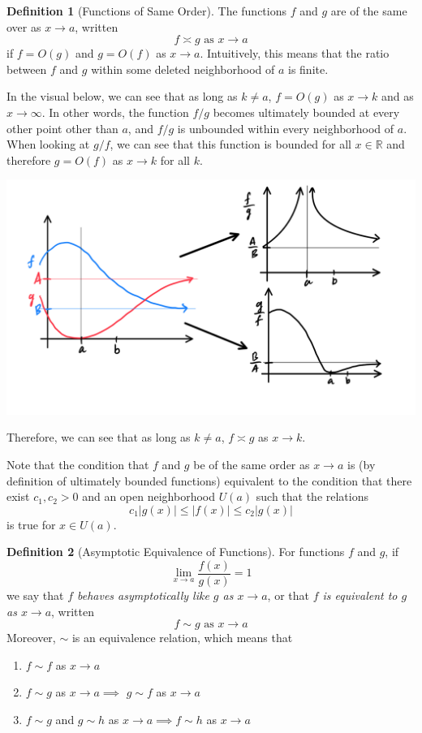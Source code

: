 \documentclass{article}
\theoremstyle{remark}
\theoremstyle{definition}
\newtheorem{definition}{Definition}[section]
\begin{document}
\begin{definition}[Functions of Same Order]
The functions $f$ and $g$ are of the same over as $x \rightarrow a$, written 
\[f \asymp g \text{ as } x \rightarrow a\]
if $f = O(g)$ and $g = O(f)$ as $x \rightarrow a$. Intuitively, this means that the ratio between $f$ and $g$ within some deleted neighborhood of $a$ is finite. 

In the visual below, we can see that as long as $k \neq a$, $f = O(g)$ as $x \rightarrow k$ and as $x \rightarrow \infty$. In other words, the function $f/g$ becomes ultimately bounded at every other point other than $a$, and $f/g$ is unbounded within every neighborhood of $a$. When looking at $g/f$, we can see that this function is bounded for all $x \in \mathbb{R}$ and therefore $g = O(f)$ as $x \rightarrow k$ for all $k$. 
\begin{center}
    \includegraphics[scale=0.25]{img/Functions_of_Same_Order.PNG}
\end{center}
Therefore, we can see that as long as $k \neq a$, $f \asymp g$ as $x \rightarrow k$.

Note that the condition that $f$ and $g$ be of the same order as $x \rightarrow a$ is (by definition of ultimately bounded functions) equivalent to the condition that there exist $c_1, c_2 > 0$ and an open neighborhood $U (a)$ such that the relations
\[c_1 |g(x)| \leq |f(x)| \leq c_2 |g(x)|\]
is true for $x \in U(a)$. 
\end{definition}

\begin{definition}[Asymptotic Equivalence of Functions]
For functions $f$ and $g$, if 
\[\lim_{x \rightarrow a} \frac{f(x)}{g(x)} = 1\]
we say that \textit{$f$ behaves asymptotically like $g$ as $x \rightarrow a$}, or that \textit{$f$ is equivalent to $g$ as $x \rightarrow a$}, written 
\[f \sim g \text{ as } x \rightarrow a\]
Moreover, $\sim$ is an equivalence relation, which means that
\begin{enumerate}
    \item $f \sim f$ as $x \rightarrow a$
    \item $f \sim g$ as $x \rightarrow a \implies$ $g \sim f$ as $x \rightarrow a$
    \item $f \sim g$ and $g \sim h$ as $x \rightarrow a \implies f \sim h$ as $x \rightarrow a$
\end{enumerate}
\end{definition}
\end{document}
